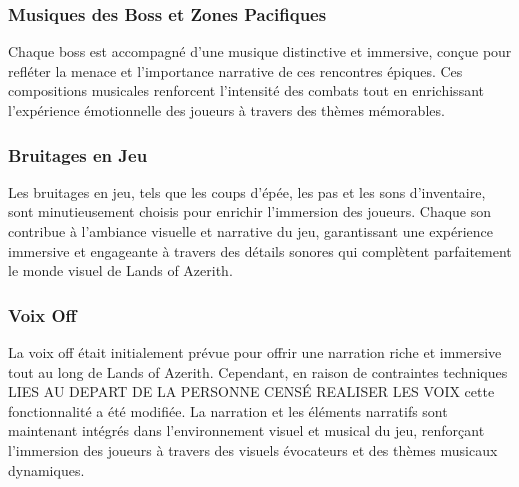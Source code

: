 \subsubsection{Musiques des Boss et Zones Pacifiques}

Chaque boss est accompagné d'une musique distinctive et immersive, conçue pour refléter la menace et l'importance narrative de ces rencontres épiques. 
Ces compositions musicales renforcent l'intensité des combats tout en enrichissant l'expérience émotionnelle des joueurs à travers des thèmes mémorables.

\subsubsection{Bruitages en Jeu}

Les bruitages en jeu, tels que les coups d'épée, les pas et les sons d'inventaire, sont minutieusement choisis pour enrichir l'immersion des joueurs. 
Chaque son contribue à l'ambiance visuelle et narrative du jeu, garantissant une expérience immersive et engageante à travers des détails sonores qui complètent parfaitement le monde visuel de Lands of Azerith.

\subsubsection{Voix Off}

La voix off était initialement prévue pour offrir une narration riche et immersive tout au long de Lands of Azerith. Cependant, en raison de contraintes techniques LIES AU DEPART DE LA PERSONNE CENSÉ REALISER LES VOIX cette fonctionnalité a été modifiée. La narration et les éléments narratifs sont maintenant intégrés dans l'environnement visuel et musical du jeu, renforçant l'immersion des joueurs à travers des visuels évocateurs et des thèmes musicaux dynamiques.

